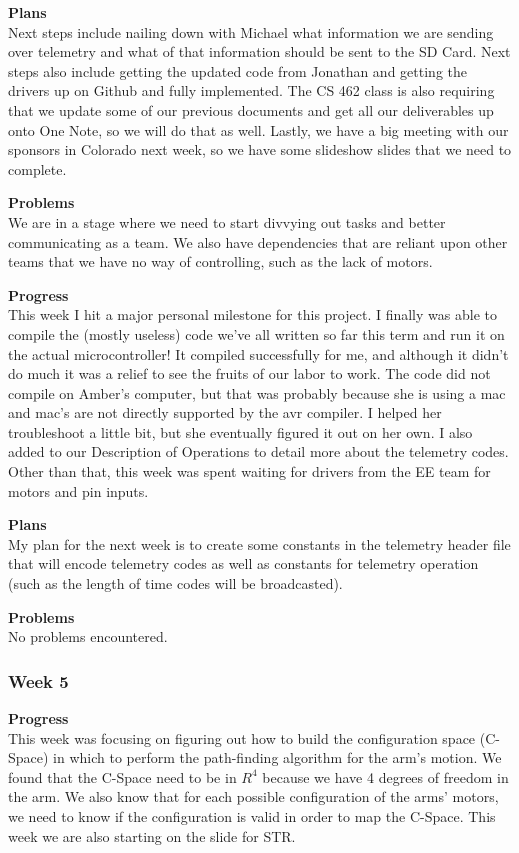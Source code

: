 \textbf{Plans} \\ 
Next steps include nailing down with Michael what information we are sending over telemetry and what of that 
information should be sent to the SD Card. Next steps also include getting the updated code from Jonathan and getting
 the drivers up on Github and fully implemented.
 The CS 462 class is also requiring that we update some of our previous documents and get all our deliverables up onto
One Note, so we will do that as well. Lastly, we have a big meeting with our sponsors in Colorado next week, so we
have some slideshow slides that we need to complete. 

\textbf{Problems} \\ 
We are in a stage where we need to start divvying out tasks
and better communicating as a team. We also have dependencies that are reliant upon other teams that we have no way 
of controlling, such as the lack of motors.

\textbf{Progress} \\
This week I hit a major personal milestone for this project. I finally was 
able to compile the (mostly useless) code we've all written so far this term 
and run it on the actual microcontroller! It compiled successfully for me, and
although it didn't do much it was a relief to see the fruits of our labor to 
work. The code did not compile on Amber's computer, but that was probably 
because she is using a mac and mac's are not directly supported by the avr 
compiler. I helped her troubleshoot a little bit, but she eventually figured 
it out on her own. I also added to our Description of Operations to detail 
more about the telemetry codes. Other than that, this week was spent waiting 
for drivers from the EE team for motors and pin inputs.

\textbf{Plans} \\
My plan for the next 
week is to create some constants in the telemetry header file that will encode
telemetry codes as well as constants for telemetry operation (such as the 
length of time codes will be broadcasted).

\textbf{Problems} \\
No problems encountered.

\subsubsection{Week 5}
\textbf{Progress} \\ 
This week was focusing on figuring out how to build the configuration space (C-Space) in which to perform the path-finding algorithm for the arm's motion. We found that the C-Space need to be in \(R^4\) because we have 4 degrees of freedom in the arm. We also know that for each possible configuration of the arms' motors, we need to know if the configuration is valid in order to map the C-Space. This week we are also starting on the slide for STR.

